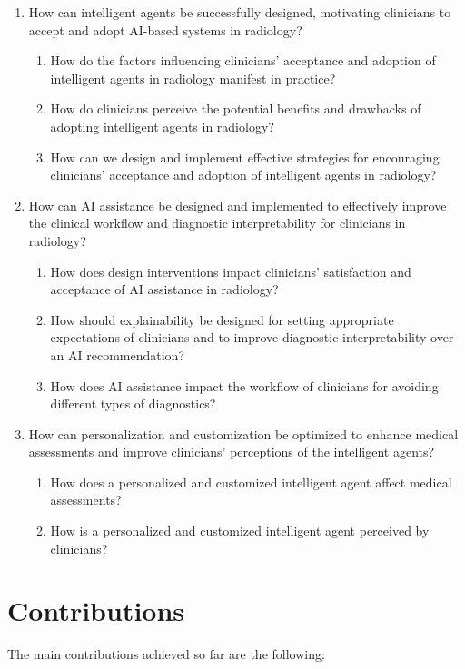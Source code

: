 \begin{enumerate}
\item How can intelligent agents be successfully designed, motivating clinicians to accept and adopt AI-based systems in radiology?
\begin{enumerate}
\item How do the factors influencing clinicians' acceptance and adoption of intelligent agents in radiology manifest in practice?
\item How do clinicians perceive the potential benefits and drawbacks of adopting intelligent agents in radiology?
\item How can we design and implement effective strategies for encouraging clinicians' acceptance and adoption of intelligent agents in radiology?
\end{enumerate}
\item How can AI assistance be designed and implemented to effectively improve the clinical workflow and diagnostic interpretability for clinicians in radiology?
\begin{enumerate}
\item How does design interventions impact clinicians' satisfaction and acceptance of AI assistance in radiology?
\item How should explainability be designed for setting appropriate expectations of clinicians and to improve diagnostic interpretability over an AI recommendation?
\item How does AI assistance impact the workflow of clinicians for avoiding different types of diagnostics?
\end{enumerate}
\item How can personalization and customization be optimized to enhance medical assessments and improve clinicians' perceptions of the intelligent agents?
\begin{enumerate}
\item How does a personalized and customized intelligent agent affect medical assessments?
\item How is a personalized and customized intelligent agent perceived by clinicians?
\end{enumerate}
\end{enumerate}

\section{Contributions}
\label{sec:chap001004}

The main contributions achieved so far are the following:

